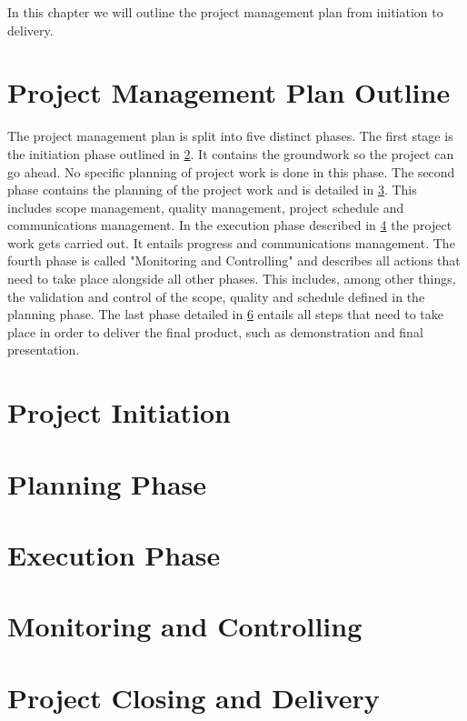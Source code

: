 In this chapter we will outline the project management plan from initiation to delivery.

\section{Project Management Plan Outline}
\label{ch:projectplanoutline}

The project management plan is split into five distinct phases. The first stage is the initiation phase outlined in \ref{ch:projectinitiation}. It contains the groundwork so the project can go ahead. No specific planning of project work is done in this phase. The second phase contains the planning of the project work and is detailed in \ref{ch:planningphase}. This includes scope management, quality management, project schedule and communications management. In the execution phase described in \ref{ch:executionphase} the project work gets carried out. It entails progress and communications management. The fourth phase is called "Monitoring and Controlling" and describes all actions that need to take place alongside all other phases. This includes, among other things, the validation and control of the scope, quality and schedule defined in the planning phase. The last phase detailed in \ref{ch:projectclosing} entails all steps that need to take place in order to deliver the final product, such as demonstration and final presentation.


\section{Project Initiation}
\label{ch:projectinitiation}

\section{Planning Phase}
\label{ch:planningphase}

\section{Execution Phase}
\label{ch:executionphase}

\section{Monitoring and Controlling}
\label{ch:monitoringcontrolling}

\section{Project Closing and Delivery}
\label{ch:projectclosing}
